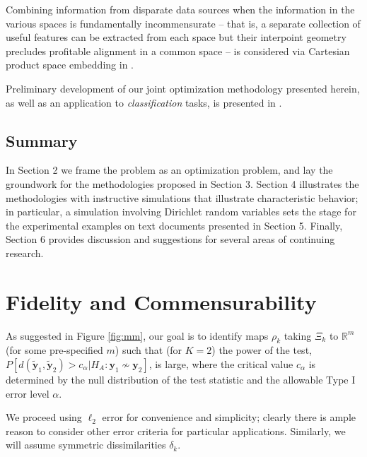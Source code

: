 \documentclass[12pt,xcolor]{article}
\newcommand{\1}{\ensuremath{\mbox{{\bf 1}}}}
\begin{document}
Combining information from disparate data sources when the information in the various spaces
is fundamentally incommensurate --
that is, a separate collection of useful features can be extracted from each space
but their interpoint geometry precludes profitable alignment in a common space --
is considered via Cartesian product space embedding in \cite{Maetal-JoC}.

Preliminary development of our joint optimization methodology presented herein,
as well as an application to {\em classification} tasks,
is presented in \cite{MMP-QMDNS}.

\subsection{Summary}

In Section 2 we frame the problem as an optimization problem,
and lay the groundwork for the methodologies proposed in Section 3.
Section 4 illustrates the methodologies with instructive
simulations that illustrate characteristic behavior;
in particular, a simulation involving Dirichlet random variables
sets the stage for the experimental examples on text documents presented in Section 5.
Finally, Section 6 provides discussion and suggestions for several areas of continuing research.

\section{Fidelity and Commensurability}

As suggested in Figure \ref{fig:mm}, our goal is to identify
maps $\rho_k$ taking $\Xi_k$ to $\mathbb{R}^m$ (for some pre-specified $m$)
such that (for $K=2$) the power of the test,
$P[d(\widetilde{\bm{y}}_1,\widetilde{\bm{y}}_2)>c_{\alpha} | H_A: \bm{y}_{1} \nsim \bm{y}_{2}]$,
is large, where the critical value $c_{\alpha}$ is determined by the null distribution of the test statistic
and the allowable Type I error level $\alpha$.

We proceed using $\ell_2$ error for convenience and simplicity;
clearly there is ample reason to consider other error criteria for particular applications.
Similarly, we will assume symmetric dissimilarities $\delta_k$.
\end{document}
